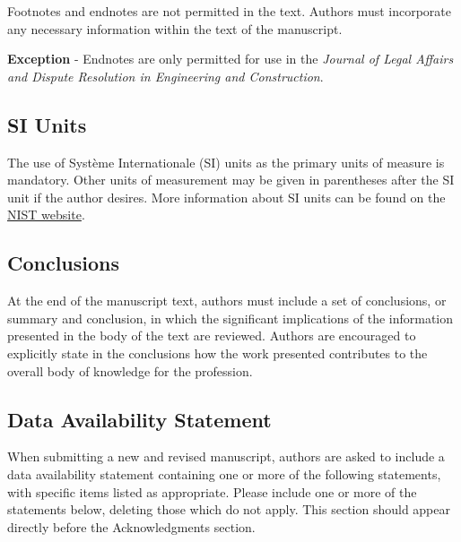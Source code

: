 \documentclass[NewProceedings, InsideFigs,LineNumbers]{asce-quarto}
\begin{document}
Footnotes and endnotes are not permitted in the text. Authors must
incorporate any necessary information within the text of the manuscript.

\textbf{Exception} - Endnotes are only permitted for use in the
\emph{Journal of Legal Affairs and Dispute Resolution in Engineering and
Construction}.

\subsection{SI Units}\label{si-units}

The use of Système Internationale (SI) units as the primary units of
measure is mandatory. Other units of measurement may be given in
parentheses after the SI unit if the author desires. More information
about SI units can be found on the
\href{http://physics.nist.gov/cuu/Units/index.html}{NIST website}.

\subsection{Conclusions}\label{conclusions}

At the end of the manuscript text, authors must include a set of
conclusions, or summary and conclusion, in which the significant
implications of the information presented in the body of the text are
reviewed. Authors are encouraged to explicitly state in the conclusions
how the work presented contributes to the overall body of knowledge for
the profession.

\subsection{Data Availability
Statement}\label{data-availability-statement}

When submitting a new and revised manuscript, authors are asked to
include a data availability statement containing one or more of the
following statements, with specific items listed as appropriate. Please
include one or more of the statements below, deleting those which do not
apply. This section should appear directly before the Acknowledgments
section.
\end{document}
